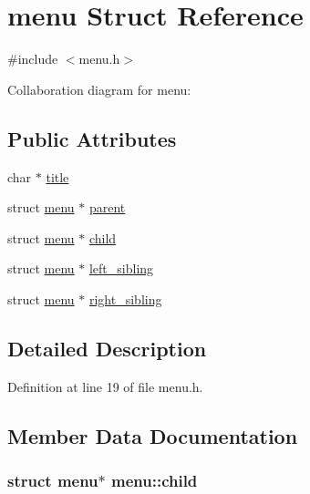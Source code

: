 \hypertarget{structmenu}{}\section{menu Struct Reference}
\label{structmenu}


{\ttfamily \#include $<$menu.\+h$>$}



Collaboration diagram for menu\+:
\subsection*{Public Attributes}
\begin{DoxyCompactItemize}
\item 
char $\ast$ \hyperlink{structmenu_af250bc734581d5eee7934057e7eb61da}{title}
\item 
struct \hyperlink{structmenu}{menu} $\ast$ \hyperlink{structmenu_ab37f2faa5398d13b27ca50dcfd4e36e4}{parent}
\item 
struct \hyperlink{structmenu}{menu} $\ast$ \hyperlink{structmenu_a28abd50705e0d5e7b477c6a876627928}{child}
\item 
struct \hyperlink{structmenu}{menu} $\ast$ \hyperlink{structmenu_a38a41dc18d5c308d3a5e87ed966db330}{left\+\_\+sibling}
\item 
struct \hyperlink{structmenu}{menu} $\ast$ \hyperlink{structmenu_a1197cb481c01c81485b65584b9bcc904}{right\+\_\+sibling}
\end{DoxyCompactItemize}


\subsection{Detailed Description}


Definition at line 19 of file menu.\+h.



\subsection{Member Data Documentation}
\subsubsection[{\texorpdfstring{child}{child}}]{\setlength{\rightskip}{0pt plus 5cm}struct {\bf menu}$\ast$ menu\+::child}\hypertarget{structmenu_a28abd50705e0d5e7b477c6a876627928}{}\label{structmenu_a28abd50705e0d5e7b477c6a876627928}


